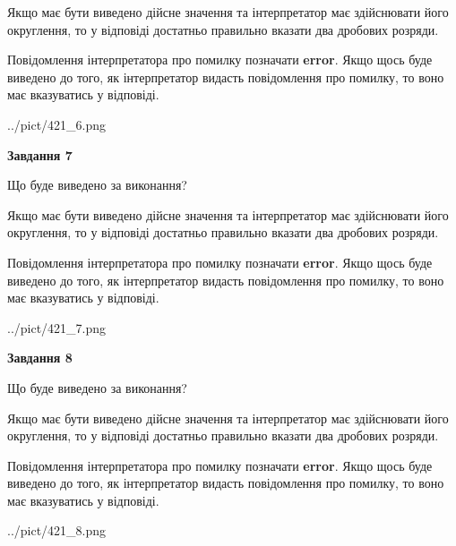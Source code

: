 \documentclass[12pt, ukrainian]{article}
\begin{document}
{\begin {Large}
Якщо має бути виведено дійсне значення та інтерпретатор має здійснювати його округлення, 
то у відповіді достатньо правильно вказати два дробових розряди.

Повідомлення інтерпретатора про помилку позначати \textbf{error}.
Якщо щось буде виведено до того, як інтерпретатор видасть повідомлення про помилку, 
то воно має вказуватись у відповіді. \par

\begin{center}
	{../pict/421_6.png}
\end{center}
\newpage

{\begin {center}\textbf{Завдання 7}\end {center}}\par
Що буде виведено за виконання? \par

Якщо має бути виведено дійсне значення та інтерпретатор має здійснювати його округлення, 
то у відповіді достатньо правильно вказати два дробових розряди.

Повідомлення інтерпретатора про помилку позначати \textbf{error}.
Якщо щось буде виведено до того, як інтерпретатор видасть повідомлення про помилку, 
то воно має вказуватись у відповіді. \par

\begin{center}
	{../pict/421_7.png}
\end{center}
\newpage

{\begin {center}\textbf{Завдання 8}\end {center}}\par
Що буде виведено за виконання? \par

Якщо має бути виведено дійсне значення та інтерпретатор має здійснювати його округлення, 
то у відповіді достатньо правильно вказати два дробових розряди.

Повідомлення інтерпретатора про помилку позначати \textbf{error}.
Якщо щось буде виведено до того, як інтерпретатор видасть повідомлення про помилку, 
то воно має вказуватись у відповіді. \par

\begin{center}
	{../pict/421_8.png}
\end{center}
\newpage


\end{Large}}
\end{document}

